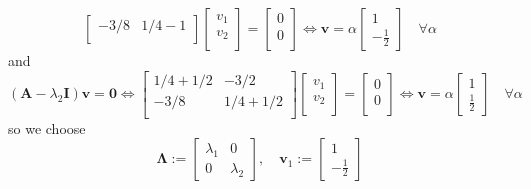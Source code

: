 \documentclass[12pt,a4paper]{article}
\begin{document}
\begin{itemize}
\begin{itemize}
\begin{equation}
\begin{bmatrix}
        -3/8 & 1/4 - 1 \\
      \end{bmatrix}
      \begin{bmatrix}
        v_{1} \\
        v_{2} \\
      \end{bmatrix}
      =
      \begin{bmatrix}
        0 \\
        0 \\
      \end{bmatrix}
      \iff
      \bm{v} = \alpha
      \begin{bmatrix}
        1 \\
        -\frac{1}{2}
      \end{bmatrix}
      \quad \forall \alpha
    \end{equation}
    and
    \begin{equation}\nonumber%
      (\bm{A}-\lambda_{2}\bm{I})\bm{v}
      = \bm{0}
      \iff
      \begin{bmatrix}
        1/4 + 1/2 & - 3/2 \\
        -3/8 & 1/4 + 1/2 \\
      \end{bmatrix}
      \begin{bmatrix}
        v_{1} \\
        v_{2} \\
      \end{bmatrix}
      =
      \begin{bmatrix}
        0 \\
        0 \\
      \end{bmatrix}
      \iff
      \bm{v} = \alpha
      \begin{bmatrix}
        1 \\
        \frac{1}{2}
      \end{bmatrix}
      \quad \forall \alpha
    \end{equation}
    so we choose
    \begin{equation}\nonumber%
      \bm{\Lambda}:=
      \begin{bmatrix}
       \lambda_{1} & 0\\
       0 & \lambda_{2}
      \end{bmatrix},
      \quad
      \bm{v}_{1} :=
      \begin{bmatrix}
        1 \\
        - \frac{1}{2}

\end{bmatrix}
\end{equation}
\end{itemize}
\end{itemize}
\end{document}
